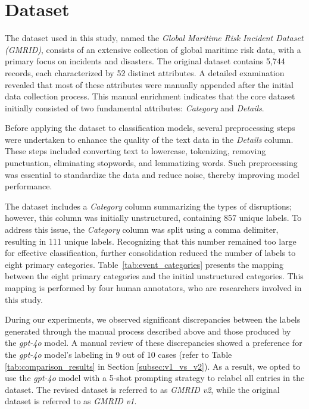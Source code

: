 \section{Dataset}

The dataset used in this study, named the \textit{Global Maritime Risk Incident Dataset (GMRID)}, consists of an extensive collection of global maritime risk data, with a primary focus on incidents and disasters. The original dataset contains 5,744 records, each characterized by 52 distinct attributes. A detailed examination revealed that most of these attributes were manually appended after the initial data collection process. This manual enrichment indicates that the core dataset initially consisted of two fundamental attributes: \textit{Category} and \textit{Details}.


Before applying the dataset to classification models, several preprocessing steps were undertaken to enhance the quality of the text data in the \textit{Details} column. These steps included converting text to lowercase, tokenizing, removing punctuation, eliminating stopwords, and lemmatizing words. Such preprocessing was essential to standardize the data and reduce noise, thereby improving model performance.

The dataset includes a \textit{Category} column summarizing the types of disruptions; however, this column was initially unstructured, containing 857 unique labels. To address this issue, the \textit{Category} column was split using a comma delimiter, resulting in 111 unique labels. Recognizing that this number remained too large for effective classification, further consolidation reduced the number of labels to eight primary categories. Table~\ref{tab:event_categories} presents the mapping between the eight primary categories and the initial unstructured categories. This mapping is performed by four human annotators, who are researchers involved in this study.

During our experiments, we observed significant discrepancies between the labels generated through the manual process described above and those produced by the \textit{gpt-4o} model. A manual review of these discrepancies showed a preference for the \textit{gpt-4o} model's labeling in 9 out of 10 cases (refer to Table \ref{tab:comparison_results} in Section \ref{subsec:v1_vs_v2}). As a result, we opted to use the \textit{gpt-4o} model with a 5-shot prompting strategy to relabel all entries in the dataset. The revised dataset is referred to as \textit{GMRID v2}, while the original dataset is referred to as \textit{GMRID v1}.

